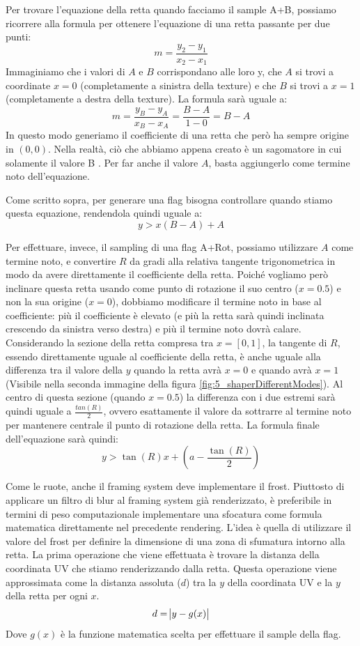 \documentclass[main.tex]{subfiles}
\begin{document}
Per trovare l'equazione della retta quando facciamo il sample A+B, possiamo ricorrere alla formula per ottenere l'equazione di una retta passante per due punti:
\[m = \frac{y_2 - y_1}{x_2 - x_1}\]
Immaginiamo che i valori di $A$ e $B$ corrispondano alle loro y, che $A$ si trovi a coordinate $x = 0$ (completamente a sinistra della texture) e che $B$ si trovi a $x = 1$ (completamente a destra della texture). La formula sarà uguale a:
\[m = \frac{y_B - y_A}{x_B - x_A} = \frac{B - A}{1 - 0} = B - A\]
In questo modo generiamo il coefficiente di una retta che però ha sempre origine in $(0, 0)$. Nella realtà, ciò che abbiamo appena creato è un sagomatore in cui solamente il valore B . Per far  anche il valore $A$, basta aggiungerlo come termine noto dell'equazione.

Come scritto sopra, per generare una flag bisogna controllare quando stiamo  questa equazione, rendendola quindi uguale a:
\[y > x(B - A) + A\]
\newline

Per effettuare, invece, il sampling di una flag A+Rot, possiamo utilizzare $A$ come termine noto, e convertire $R$ da gradi alla relativa tangente trigonometrica in modo da avere direttamente il coefficiente della retta. Poiché vogliamo però inclinare questa retta usando come punto di rotazione il suo centro ($x = 0.5$) e non la sua origine ($x = 0$), dobbiamo modificare il termine noto in base al coefficiente: più il coefficiente è elevato (e più la retta sarà quindi inclinata crescendo da sinistra verso destra) e più il termine noto dovrà calare. Considerando la sezione della retta compresa tra $x = [0, 1]$, la tangente di $R$, essendo direttamente uguale al coefficiente della retta, è anche uguale alla differenza tra il valore della $y$ quando la retta avrà $x = 0$ e quando avrà $x = 1$ (Visibile nella seconda immagine della figura \ref{fig:5_shaperDifferentModes}). Al centro di questa sezione (quando $x = 0.5$) la differenza con i due estremi sarà quindi uguale a $\frac{tan(R)}{2}$, ovvero esattamente il valore da sottrarre al termine noto per mantenere centrale il punto di rotazione della retta. La formula finale dell'equazione sarà quindi:
\[y > \tan(R)x + (a - \frac{\tan(R)}{2})\]

Come le ruote, anche il framing system deve implementare il frost. Piuttosto di applicare un filtro di blur al framing system già renderizzato, è preferibile in termini di peso computazionale implementare una sfocatura come formula matematica direttamente nel precedente rendering. L'idea è quella di utilizzare il valore del frost per definire la dimensione di una zona di sfumatura intorno alla retta. La prima operazione che viene effettuata è trovare la distanza della coordinata UV che stiamo renderizzando dalla retta. Questa operazione viene approssimata come la distanza assoluta ($d$) tra la $y$ della coordinata UV e la $y$ della retta per ogni $x$.
\[d = \abs{y - g(x)}\]
Dove $g(x)$ è la funzione matematica scelta per effettuare il sample della flag.
\end{document}
